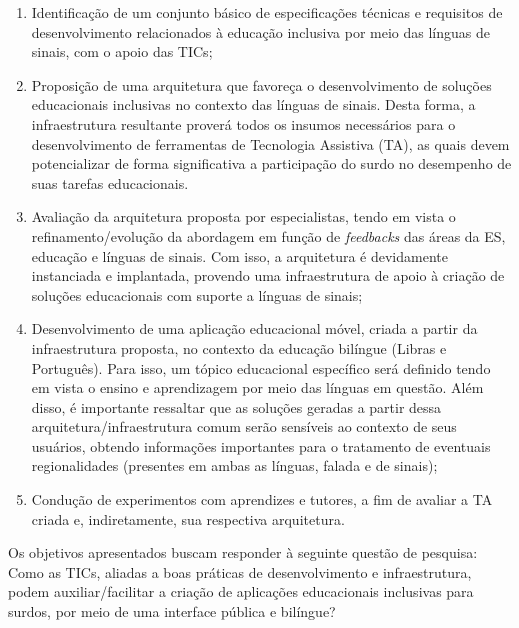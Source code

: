 \begin{enumerate}
\item Identificação de um conjunto básico de especificações técnicas e requisitos de desenvolvimento relacionados à educação inclusiva por meio das línguas de sinais, com o apoio das TICs; %
\item Proposição de uma arquitetura que favoreça o desenvolvimento de soluções educacionais inclusivas no contexto das línguas de sinais. Desta forma, a infraestrutura resultante proverá todos os insumos necessários para o desenvolvimento de ferramentas de Tecnologia Assistiva (TA), as quais devem potencializar de forma significativa a participação do surdo no desempenho de suas tarefas educacionais.
\item Avaliação da arquitetura proposta por especialistas, tendo em vista o refinamento/evolução da abordagem em função de \textit{feedbacks} das áreas da ES, educação e línguas de sinais. Com isso, a arquitetura é devidamente instanciada e implantada, provendo uma infraestrutura de apoio à criação de soluções educacionais com suporte a línguas de sinais;
\item Desenvolvimento de uma aplicação educacional móvel, criada a partir da infraestrutura proposta, no contexto da educação bilíngue (Libras e Português). Para isso, um tópico educacional específico será definido tendo em vista o ensino e aprendizagem por meio das línguas em questão. %
Além disso, é importante ressaltar que as soluções geradas a partir dessa arquitetura/infraestrutura comum serão sensíveis ao contexto de seus usuários, obtendo informações importantes para o tratamento de eventuais regionalidades (presentes em ambas as línguas, falada e de sinais);
\item Condução de experimentos com aprendizes e tutores, %
a fim de avaliar a TA criada e, indiretamente, sua respectiva arquitetura.
\end{enumerate}

Os objetivos apresentados buscam responder à seguinte questão de pesquisa: Como as TICs, aliadas a boas práticas de desenvolvimento e infraestrutura, podem auxiliar/facilitar a criação de aplicações educacionais inclusivas para surdos, por meio de uma interface pública e bilíngue?

